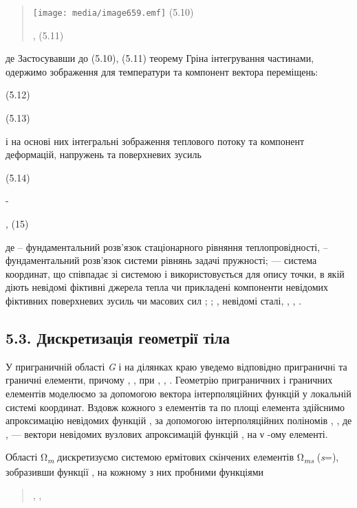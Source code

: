 \begin{quote}
\texttt{[image: media/image659.emf]}
(5.10)

, (5.11)
\end{quote}

де Застосувавши до (5.10), (5.11) теорему Гріна інтегрування частинами,
одержимо зображення для температури та компонент вектора переміщень:

(5.12)

(5.13)

і на основі них інтегральні зображення теплового потоку та компонент
деформацій, напружень та поверхневих зусиль

(5.14)

-

, (15)

де -- фундаментальний розв'язок стаціонарного рівняння теплопровідності,
-- фундаментальний розв'язок системи рівнянь задачі пружності; ---
система координат, що співпадає зі системою і використовується для опису
точки, в якій діють невідомі фіктивні джерела тепла чи прикладені
компоненти невідомих фіктивних поверхневих зусиль чи масових сил ; ; ,
невідомі сталі, , , .

\hypertarget{ux434ux438ux441ux43aux440ux435ux442ux438ux437ux430ux446ux456ux44f-ux433ux435ux43eux43cux435ux442ux440ux456ux457-ux442ux456ux43bux430-1}{%
\subsection{5.3. Дискретизація геометрії
тіла}\label{ux434ux438ux441ux43aux440ux435ux442ux438ux437ux430ux446ux456ux44f-ux433ux435ux43eux43cux435ux442ux440ux456ux457-ux442ux456ux43bux430-1}}

У приграничній області \emph{G} і на ділянках краю уведемо відповідно
пригра­нич­нi та граничні елементи, при­чому , , при , , . Геометрію
приграничних і граничних елементів моделюємо за допомогою вектора
інтерполяційних функцій у локальній системі координат. Вздовж кожного з
елементів та по площі елемента здійснимо апроксимацію невідомих функцій
, за допомогою інтерполяційних поліномів , , де , --- вектори невідомих
вузлових апроксимацій функцій , на ν -ому елементі.

Області Ω\emph{\textsubscript{m}} дискретизуємо системою ермітових
скінчених елементів Ω\emph{\textsubscript{ms}} (\emph{s}=), зобразивши
функції , на кожному з них пробними функціями

\begin{quote}
, ,
\end{quote}

